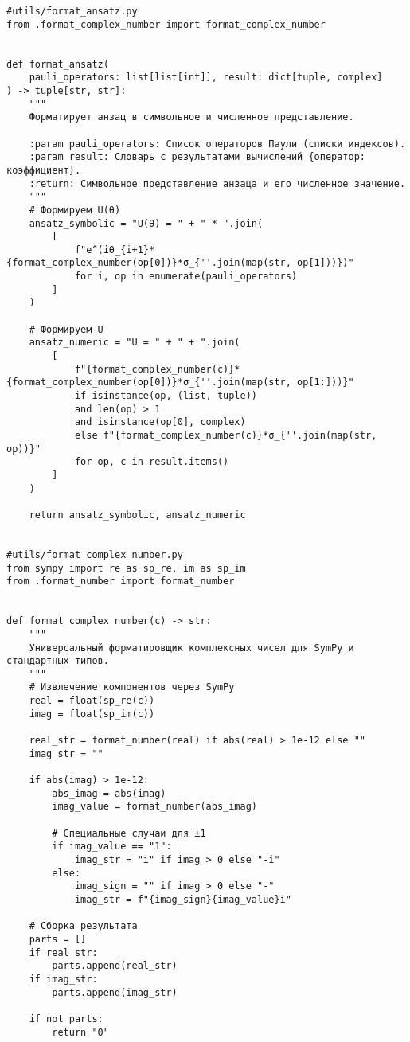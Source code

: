 \documentclass[a4paper]{report}
\begin{document}
\begin{lstlisting}
#utils/format_ansatz.py
from .format_complex_number import format_complex_number


def format_ansatz(
    pauli_operators: list[list[int]], result: dict[tuple, complex]
) -> tuple[str, str]:
    """
    Форматирует анзац в символьное и численное представление.

    :param pauli_operators: Список операторов Паули (списки индексов).
    :param result: Словарь с результатами вычислений {оператор: коэффициент}.
    :return: Символьное представление анзаца и его численное значение.
    """
    # Формируем U(θ)
    ansatz_symbolic = "U(θ) = " + " * ".join(
        [
            f"e^(iθ_{i+1}*{format_complex_number(op[0])}*σ_{''.join(map(str, op[1]))})"
            for i, op in enumerate(pauli_operators)
        ]
    )

    # Формируем U
    ansatz_numeric = "U = " + " + ".join(
        [
            f"{format_complex_number(c)}*{format_complex_number(op[0])}*σ_{''.join(map(str, op[1:]))}"
            if isinstance(op, (list, tuple))
            and len(op) > 1
            and isinstance(op[0], complex)
            else f"{format_complex_number(c)}*σ_{''.join(map(str, op))}"
            for op, c in result.items()
        ]
    )

    return ansatz_symbolic, ansatz_numeric


#utils/format_complex_number.py
from sympy import re as sp_re, im as sp_im
from .format_number import format_number


def format_complex_number(c) -> str:
    """
    Универсальный форматировщик комплексных чисел для SymPy и стандартных типов.
    """
    # Извлечение компонентов через SymPy
    real = float(sp_re(c))
    imag = float(sp_im(c))

    real_str = format_number(real) if abs(real) > 1e-12 else ""
    imag_str = ""

    if abs(imag) > 1e-12:
        abs_imag = abs(imag)
        imag_value = format_number(abs_imag)

        # Специальные случаи для ±1
        if imag_value == "1":
            imag_str = "i" if imag > 0 else "-i"
        else:
            imag_sign = "" if imag > 0 else "-"
            imag_str = f"{imag_sign}{imag_value}i"

    # Сборка результата
    parts = []
    if real_str:
        parts.append(real_str)
    if imag_str:
        parts.append(imag_str)

    if not parts:
        return "0"


\end{lstlisting}
\end{document}
